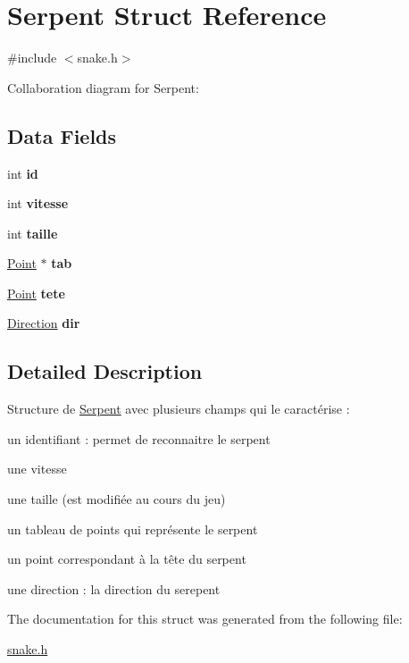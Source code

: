 \hypertarget{struct_serpent}{}\section{Serpent Struct Reference}
\label{struct_serpent}


{\ttfamily \#include $<$snake.\+h$>$}



Collaboration diagram for Serpent\+:
\subsection*{Data Fields}
\begin{DoxyCompactItemize}
\item 
\hypertarget{struct_serpent_a7441ef0865bcb3db9b8064dd7375c1ea}{}int {\bfseries id}\label{struct_serpent_a7441ef0865bcb3db9b8064dd7375c1ea}

\item 
\hypertarget{struct_serpent_a4b512d0a6dcc3c7d7e6dd9a7714852c4}{}int {\bfseries vitesse}\label{struct_serpent_a4b512d0a6dcc3c7d7e6dd9a7714852c4}

\item 
\hypertarget{struct_serpent_a29bf3fc0ffe4e72e45f0c84ab4f8cd1e}{}int {\bfseries taille}\label{struct_serpent_a29bf3fc0ffe4e72e45f0c84ab4f8cd1e}

\item 
\hypertarget{struct_serpent_ad44190bd0d6846f34b2f440d8b028653}{}\hyperlink{struct_point}{Point} $\ast$ {\bfseries tab}\label{struct_serpent_ad44190bd0d6846f34b2f440d8b028653}

\item 
\hypertarget{struct_serpent_a7029c13111e60317aa11bbabd7a6dd66}{}\hyperlink{struct_point}{Point} {\bfseries tete}\label{struct_serpent_a7029c13111e60317aa11bbabd7a6dd66}

\item 
\hypertarget{struct_serpent_a58d94fa8f7ddf189cd6eabdea4f2346c}{}\hyperlink{snake_8h_a224b9163917ac32fc95a60d8c1eec3aa}{Direction} {\bfseries dir}\label{struct_serpent_a58d94fa8f7ddf189cd6eabdea4f2346c}

\end{DoxyCompactItemize}


\subsection{Detailed Description}
Structure de \hyperlink{struct_serpent}{Serpent} avec plusieurs champs qui le caractérise \+:
\begin{DoxyItemize}
\item un identifiant \+: permet de reconnaitre le serpent
\item une vitesse
\item une taille (est modifiée au cours du jeu)
\item un tableau de points qui représente le serpent
\item un point correspondant à la tête du serpent
\item une direction \+: la direction du serepent 
\end{DoxyItemize}

The documentation for this struct was generated from the following file\+:\begin{DoxyCompactItemize}
\item 
\hyperlink{snake_8h}{snake.\+h}\end{DoxyCompactItemize}

